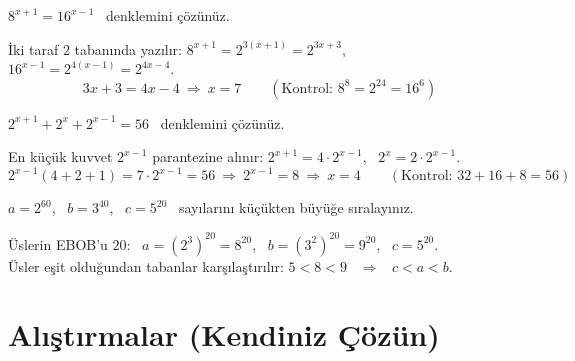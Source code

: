 \begin{alistirma}
\(8^{x+1}=16^{x-1}\) \ denklemini çözünüz.
\end{alistirma}
\begin{cozum}
İki taraf \(2\) tabanında yazılır: \(8^{x+1}=2^{3(x+1)}=2^{3x+3}\), \ \(16^{x-1}=2^{4(x-1)}=2^{4x-4}\).
\[3x+3=4x-4\ \Rightarrow\ x=7\qquad(\text{Kontrol: } 8^8=2^{24}=16^6)\]
\end{cozum}

\begin{alistirma}
\(2^{x+1}+2^{x}+2^{x-1}=56\) \ denklemini çözünüz.
\end{alistirma}
\begin{cozum}
En küçük kuvvet \(2^{x-1}\) parantezine alınır: \(2^{x+1}=4\cdot 2^{x-1}\), \ \(2^{x}=2\cdot 2^{x-1}\).
\[2^{x-1}(4+2+1)=7\cdot 2^{x-1}=56\ \Rightarrow\ 2^{x-1}=8\ \Rightarrow\ x=4\qquad(\text{Kontrol: } 32+16+8=56)\]
\end{cozum}

\begin{alistirma}
\(a=2^{60}\), \ \(b=3^{40}\), \ \(c=5^{20}\) \ sayılarını küçükten büyüğe sıralayınız.
\end{alistirma}
\begin{cozum}
Üslerin EBOB'u \(20\): \ \(a=(2^3)^{20}=8^{20}\), \ \(b=(3^2)^{20}=9^{20}\), \ \(c=5^{20}\).\\
Üsler eşit olduğundan tabanlar karşılaştırılır: \(5<8<9\) \ \(\Rightarrow\) \ \(c<a<b\).
\end{cozum}

\kendinizoncesi
\section{Alıştırmalar (Kendiniz Çözün)}

